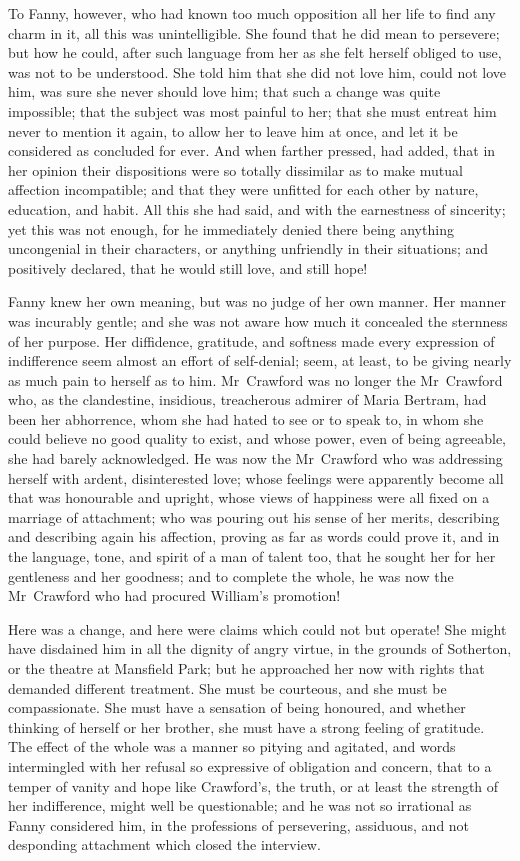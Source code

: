 To Fanny, however, who had known too much opposition all her life to find any charm in it, all this was unintelligible. She found that he did mean to persevere; but how he could, after such language from her as she felt herself obliged to use, was not to be understood. She told him that she did not love him, could not love him, was sure she never should love him; that such a change was quite impossible; that the subject was most painful to her; that she must entreat him never to mention it again, to allow her to leave him at once, and let it be considered as concluded for ever. And when farther pressed, had added, that in her opinion their dispositions were so totally dissimilar as to make mutual affection incompatible; and that they were unfitted for each other by nature, education, and habit. All this she had said, and with the earnestness of sincerity; yet this was not enough, for he immediately denied there being anything uncongenial in their characters, or anything unfriendly in their situations; and positively declared, that he would still love, and still hope!

Fanny knew her own meaning, but was no judge of her own manner. Her manner was incurably gentle; and she was not aware how much it concealed the sternness of her purpose. Her diffidence, gratitude, and softness made every expression of indifference seem almost an effort of self-denial; seem, at least, to be giving nearly as much pain to herself as to him. Mr~Crawford was no longer the Mr~Crawford who, as the clandestine, insidious, treacherous admirer of Maria Bertram, had been her abhorrence, whom she had hated to see or to speak to, in whom she could believe no good quality to exist, and whose power, even of being agreeable, she had barely acknowledged. He was now the Mr~Crawford who was addressing herself with ardent, disinterested love; whose feelings were apparently become all that was honourable and upright, whose views of happiness were all fixed on a marriage of attachment; who was pouring out his sense of her merits, describing and describing again his affection, proving as far as words could prove it, and in the language, tone, and spirit of a man of talent too, that he sought her for her gentleness and her goodness; and to complete the whole, he was now the Mr~Crawford who had procured William's promotion!

Here was a change, and here were claims which could not but operate! She might have disdained him in all the dignity of angry virtue, in the grounds of Sotherton, or the theatre at Mansfield Park; but he approached her now with rights that demanded different treatment. She must be courteous, and she must be compassionate. She must have a sensation of being honoured, and whether thinking of herself or her brother, she must have a strong feeling of gratitude. The effect of the whole was a manner so pitying and agitated, and words intermingled with her refusal so expressive of obligation and concern, that to a temper of vanity and hope like Crawford's, the truth, or at least the strength of her indifference, might well be questionable; and he was not so irrational as Fanny considered him, in the professions of persevering, assiduous, and not desponding attachment which closed the interview.

